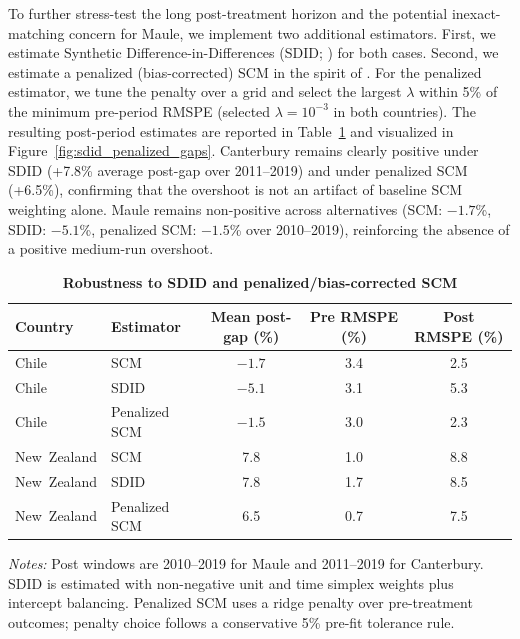 \documentclass[12pt]{article}
\begin{document}
To further stress-test the long post-treatment horizon and the potential inexact-matching concern for Maule, we implement two additional estimators. First, we estimate Synthetic Difference-in-Differences (SDID; \cite{arkhangelsky2021sdid}) for both cases. Second, we estimate a penalized (bias-corrected) SCM in the spirit of \textcite{abadie2021penalized}. For the penalized estimator, we tune the penalty over a grid and select the largest $\lambda$ within 5\% of the minimum pre-period RMSPE (selected $\lambda=10^{-3}$ in both countries). The resulting post-period estimates are reported in Table~\ref{tab:sdid_penalized} and visualized in Figure~\ref{fig:sdid_penalized_gaps}. Canterbury remains clearly positive under SDID (+7.8\% average post-gap over 2011--2019) and under penalized SCM (+6.5\%), confirming that the overshoot is not an artifact of baseline SCM weighting alone. Maule remains non-positive across alternatives (SCM: $-1.7$\%, SDID: $-5.1$\%, penalized SCM: $-1.5$\% over 2010--2019), reinforcing the absence of a positive medium-run overshoot.\\

\begin{table}[H]
\centering
\caption{\textbf{Robustness to SDID and penalized/bias-corrected SCM}}
\label{tab:sdid_penalized}
\small
\setlength{\tabcolsep}{6pt}
\begin{tabular}{llccc}
\toprule
\textbf{Country} & \textbf{Estimator} & \textbf{Mean post-gap (\%)} & \textbf{Pre RMSPE (\%)} & \textbf{Post RMSPE (\%)} \\
\midrule
Chile & SCM & $-1.7$ & 3.4 & 2.5 \\
Chile & SDID & $-5.1$ & 3.1 & 5.3 \\
Chile & Penalized SCM & $-1.5$ & 3.0 & 2.3 \\
New~Zealand & SCM & 7.8 & 1.0 & 8.8 \\
New~Zealand & SDID & 7.8 & 1.7 & 8.5 \\
New~Zealand & Penalized SCM & 6.5 & 0.7 & 7.5 \\
\bottomrule
\end{tabular}
\begin{minipage}{0.95\textwidth}\footnotesize\vspace{1ex}
\textit{Notes:} Post windows are 2010--2019 for Maule and 2011--2019 for Canterbury. SDID is estimated with non-negative unit and time simplex weights plus intercept balancing. Penalized SCM uses a ridge penalty over pre-treatment outcomes; penalty choice follows a conservative 5\% pre-fit tolerance rule.
\end{minipage}
\end{table}
\end{document}

